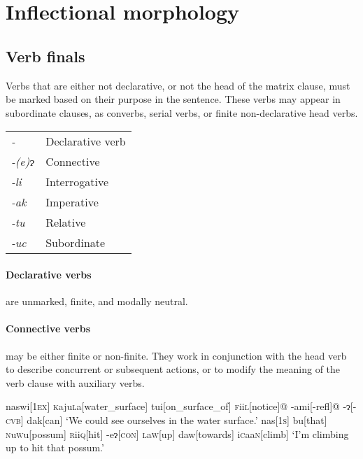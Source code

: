 \documentclass[a4paper,10pt,twoside,openright]{memoir}
\newcommand{\lilglot}{ɂ}
\newcommand{\nm}{\symbol{"2205}}
\newcommand{\famwordold}[5]{#1\textsc{#2}#3\textsc{#4}#5}
\begin{document}
\section{Inflectional morphology}

\subsection{Verb finals}

Verbs that are either not declarative, or not the head of the matrix clause, must be marked based on their purpose in the sentence. These verbs may appear in subordinate clauses, as converbs, serial verbs, or finite non-declarative head verbs.

\begin{table}[ht]
    \centering
    \begin{tabular}{>{\em}ll}
        -\nm        & Declarative verb \\
        -(e)\lilglot   & Connective \\
        -li         & Interrogative \\
        -ak         & Imperative \\
        -tu         & Relative \\
        -uc         & Subordinate \\
    \end{tabular}
\end{table}

\paragraph{Declarative verbs} are unmarked, finite, and modally neutral.

\paragraph{Connective verbs} may be either finite or non-finite. They work in conjunction with the head verb to describe concurrent or subsequent actions, or to modify the meaning of the verb clause with auxiliary verbs.

\pex[interpartskip=3ex]
\a
\begingl
naswi[\textsc{1ex}]
\famwordold{}{k}{aju}{l}{a}[water\_surface]
tui[on\_surface\_of]
\famwordold{}{f}{ii}{l}{}[notice]@
-ami[\sc -refl]@
-\lilglot[-\textsc{cvb}]
dak[can]
\glft `We could see ourselves in the water surface.'
\endgl
\a
\begingl
nas[\textsc{1s}]
bu[that]
\famwordold{}{n}{u}{w}{u}[possum]
\famwordold{}{r}{ii}{q}{}[hit]
-e\lilglot[\textsc{con}]
\famwordold{}{l}{a}{w}{}[up]
daw[towards]
\famwordold{i}{c}{aa}{n}{}[climb]
\glft `I'm climbing up to hit that possum.'
\endgl
\xe
\end{document}
